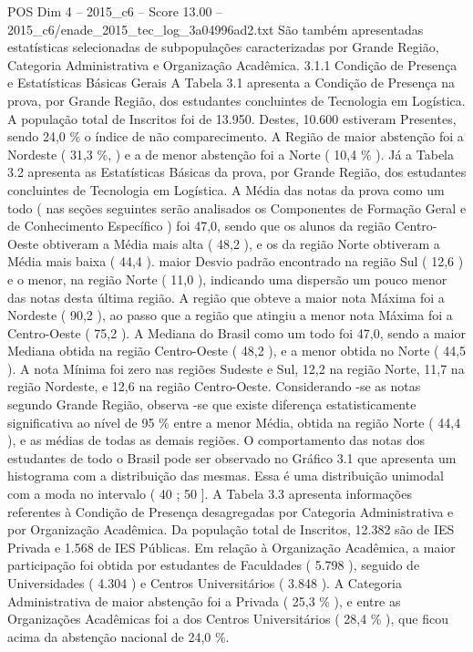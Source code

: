 \begin{textsample}{POS Dim 4 – 2015\_c6 – Score 13.00 – 2015\_c6/enade\_2015\_tec\_log\_3a04996ad2.txt}
São também apresentadas estatísticas selecionadas de subpopulações caracterizadas por Grande Região, Categoria Administrativa e Organização Acadêmica. 3.1.1 Condição de Presença e Estatísticas Básicas Gerais A Tabela 3.1 apresenta a Condição de Presença na prova, por Grande Região, dos estudantes concluintes de Tecnologia em Logística.
A população total de Inscritos foi de 13.950.
Destes, 10.600 estiveram Presentes, sendo 24,0 \% o índice de não comparecimento.
A Região de maior abstenção foi a Nordeste ( 31,3 \%, ) e a de menor abstenção foi a Norte ( 10,4 \% ).
Já a Tabela 3.2 apresenta as Estatísticas Básicas da prova, por Grande Região, dos estudantes concluintes de Tecnologia em Logística.
A Média das notas da prova como um todo ( nas seções seguintes serão analisados os Componentes de Formação Geral e de Conhecimento Específico ) foi 47,0, sendo que os alunos da região Centro-Oeste obtiveram a Média mais alta ( 48,2 ), e os da região Norte obtiveram a Média mais baixa ( 44,4 ). maior Desvio padrão encontrado na região Sul ( 12,6 ) e o menor, na região Norte ( 11,0 ), indicando uma dispersão um pouco menor das notas desta última região.
A região que obteve a maior nota Máxima foi a Nordeste ( 90,2 ), ao passo que a região que atingiu a menor nota Máxima foi a Centro-Oeste ( 75,2 ).
A Mediana do Brasil como um todo foi 47,0, sendo a maior Mediana obtida na região Centro-Oeste ( 48,2 ), e a menor obtida no Norte ( 44,5 ).
A nota Mínima foi zero nas regiões Sudeste e Sul, 12,2 na região Norte, 11,7 na região Nordeste, e 12,6 na região Centro-Oeste.
Considerando -se as notas segundo Grande Região, observa -se que existe diferença estatisticamente significativa ao nível de 95 \% entre a menor Média, obtida na região Norte ( 44,4 ), e as médias de todas as demais regiões.
O comportamento das notas dos estudantes de todo o Brasil pode ser observado no Gráfico 3.1 que apresenta um histograma com a distribuição das mesmas.
Essa é uma distribuição unimodal com a moda no intervalo ( 40 ; 50 ].
A Tabela 3.3 apresenta informações referentes à Condição de Presença desagregadas por Categoria Administrativa e por Organização Acadêmica.
Da população total de Inscritos, 12.382 são de IES Privada e 1.568 de IES Públicas.
Em relação à Organização Acadêmica, a maior participação foi obtida por estudantes de Faculdades ( 5.798 ), seguido de Universidades ( 4.304 ) e Centros Universitários ( 3.848 ).
A Categoria Administrativa de maior abstenção foi a Privada ( 25,3 \% ), e entre as Organizações Acadêmicas foi a dos Centros Universitários ( 28,4 \% ), que ficou acima da abstenção nacional de 24,0 \%.

\end{textsample}
